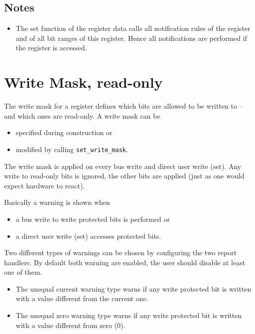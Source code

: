 \subsection{Notes}

\begin{itemize}
  \item The set function of the register data calls all notification rules of the register and of all bit ranges of this register. Hence all notifications are performed if the register is accessed.
\end{itemize}


\section{Write Mask, read-only}
\label{sec:WriteMask}

The write mask for a register defines which bits are allowed to be written to -- and which ones are read-only. A write mask can be 
\begin{itemize}
  \item specified during construction or 
  \item modified by calling \lstinline|set_write_mask|.
\end{itemize}

The write mask is applied on every bus write and direct user write (set).
Any write to read-only bits is ignored, the other bits are applied (just as one would expect hardware to react).

\noindent
Basically a warning is shown when 
\begin{itemize}
  \item a bus write to write protected bits is performed or
  \item a direct user write (set) accesses protected bits.
\end{itemize}

\noindent
Two different types of warnings can be chosen by configuring the two report handlers. By default both warning are enabled, the user should disable at least one of them.
\begin{itemize}
  \item The {\sffamily unequal current} warning type warns if any write protected bit is written with a value different from the current one.
  \item The {\sffamily unequal zero} warning type warns if any write protected bit is written with a value different from zero (0).
\end{itemize}

